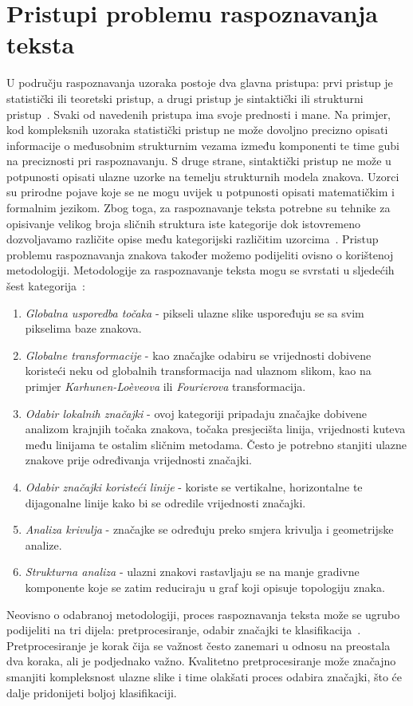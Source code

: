 \section{Pristupi problemu raspoznavanja teksta}
\label{sec:pristupi-problemu-raspoznavanja-teksta}
U području raspoznavanja uzoraka postoje dva glavna pristupa: prvi pristup je statistički ili teoretski pristup, a drugi
pristup je sintaktički ili strukturni pristup\ \citep{govindan1989}. Svaki od navedenih pristupa ima svoje prednosti i
mane. Na primjer, kod kompleksnih uzoraka statistički pristup ne može dovoljno precizno opisati informacije o međusobnim
strukturnim vezama između komponenti te time gubi na preciznosti pri raspoznavanju. S druge strane, sintaktički pristup
ne može u potpunosti opisati ulazne uzorke na temelju strukturnih modela znakova. Uzorci su prirodne pojave koje se ne
mogu uvijek u potpunosti opisati matematičkim i formalnim jezikom. Zbog toga, za raspoznavanje teksta potrebne su
tehnike za opisivanje velikog broja sličnih struktura iste kategorije dok istovremeno dozvoljavamo različite opise
među kategorijski različitim uzorcima\ \citep{govindan1989}. Pristup problemu raspoznavanja znakova također možemo
podijeliti ovisno o korištenoj metodologiji. Metodologije za raspoznavanje teksta mogu se svrstati u sljedećih šest
kategorija\ \citep{mantas1986}:
\begin{enumerate}
    \item \emph{Globalna usporedba točaka} - pikseli ulazne slike uspoređuju se sa svim pikselima baze znakova.
    \item \emph{Globalne transformacije} - kao značajke odabiru se vrijednosti dobivene koristeći neku od globalnih
    transformacija nad ulaznom slikom, kao na primjer \emph{Karhunen-Loèveova} ili \emph{Fourierova} transformacija.
    \item \emph{Odabir lokalnih značajki} - ovoj kategoriji pripadaju značajke dobivene analizom krajnjih točaka
    znakova, točaka presjecišta linija, vrijednosti kuteva među linijama te ostalim sličnim metodama. Često je potrebno
    stanjiti ulazne znakove prije određivanja vrijednosti značajki.
    \item \emph{Odabir značajki koristeći linije} - koriste se vertikalne, horizontalne te dijagonalne linije kako bi
    se odredile vrijednosti značajki.
    \item \emph{Analiza krivulja} - značajke se određuju preko smjera krivulja i geometrijske analize.
    \item \emph{Strukturna analiza} - ulazni znakovi rastavljaju se na manje gradivne komponente koje se zatim
    reduciraju u graf koji opisuje topologiju znaka.
\end{enumerate}
Neovisno o odabranoj metodologiji, proces raspoznavanja teksta može se ugrubo podijeliti na tri dijela:
pretprocesiranje, odabir značajki te klasifikacija\ \citep{mori1999}. Pretprocesiranje je korak čija se važnost često
zanemari u odnosu na preostala dva koraka, ali je podjednako važno. Kvalitetno pretprocesiranje može značajno smanjiti
kompleksnost ulazne slike i time olakšati proces odabira značajki, što će dalje pridonijeti boljoj klasifikaciji.


